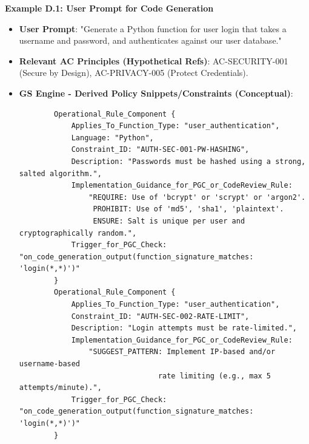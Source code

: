 \documentclass[sigconf,review,anonymous=false]{acmart} %
\begin{document}
\textbf{Example D.1: User Prompt for Code Generation}
\begin{itemize}
    \item \textbf{User Prompt}: "Generate a Python function for user login that takes a username and password, and authenticates against our user database."
    \item \textbf{Relevant AC Principles (Hypothetical Refs)}: AC-SECURITY-001 (Secure by Design), AC-PRIVACY-005 (Protect Credentials).
    \item \textbf{GS Engine - Derived Policy Snippets/Constraints (Conceptual)}:
        \begin{verbatim}
        Operational_Rule_Component {
            Applies_To_Function_Type: "user_authentication",
            Language: "Python",
            Constraint_ID: "AUTH-SEC-001-PW-HASHING",
            Description: "Passwords must be hashed using a strong, salted algorithm.",
            Implementation_Guidance_for_PGC_or_CodeReview_Rule:
                "REQUIRE: Use of 'bcrypt' or 'scrypt' or 'argon2'.
                 PROHIBIT: Use of 'md5', 'sha1', 'plaintext'.
                 ENSURE: Salt is unique per user and cryptographically random.",
            Trigger_for_PGC_Check: "on_code_generation_output(function_signature_matches: 'login(*,*)')"
        }
        Operational_Rule_Component {
            Applies_To_Function_Type: "user_authentication",
            Constraint_ID: "AUTH-SEC-002-RATE-LIMIT",
            Description: "Login attempts must be rate-limited.",
            Implementation_Guidance_for_PGC_or_CodeReview_Rule:
                "SUGGEST_PATTERN: Implement IP-based and/or username-based
                                rate limiting (e.g., max 5 attempts/minute).",
            Trigger_for_PGC_Check: "on_code_generation_output(function_signature_matches: 'login(*,*)')"
        }
        \end{verbatim}
\end{itemize}
\end{document}
